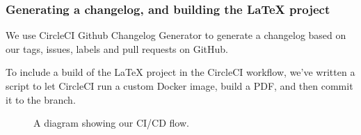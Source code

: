 \subsubsection{Generating a changelog, and building the LaTeX project}

We use CircleCI Github Changelog Generator \cite{tool:changelog-generator} to generate a changelog based on our tags, issues, labels and pull requests on GitHub.

To include a build of the LaTeX project in the CircleCI workflow, we've written a script to let CircleCI run a custom Docker image, build a PDF, and then commit it to the branch.

\begin{figure}[H]
    \caption{A diagram showing our CI/CD flow.}
    \label{fig:ci-cd-diagram}
\end{figure}
